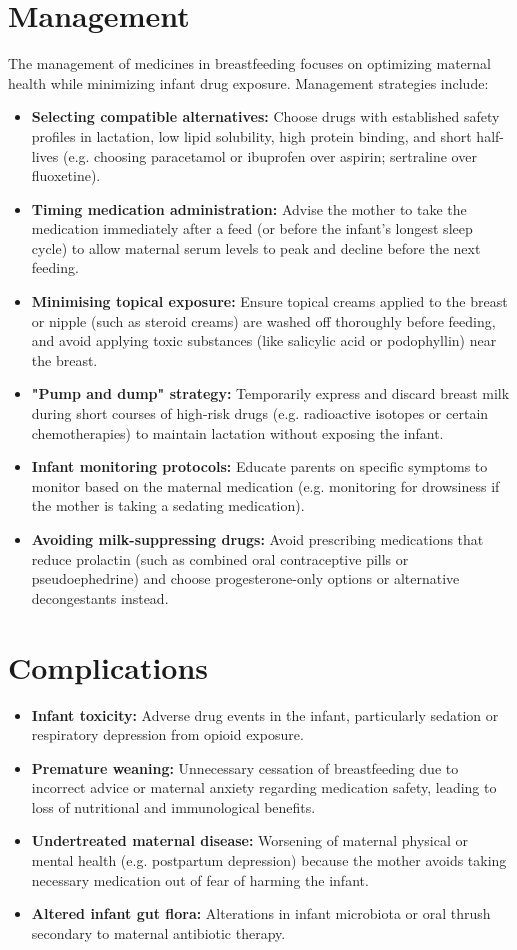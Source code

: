 \section*{Management}
The management of medicines in breastfeeding focuses on optimizing maternal health while minimizing infant drug exposure. Management strategies include:
\begin{itemize}
    \item \textbf{Selecting compatible alternatives:} Choose drugs with established safety profiles in lactation, low lipid solubility, high protein binding, and short half-lives (e.g. choosing paracetamol or ibuprofen over aspirin; sertraline over fluoxetine).
    \item \textbf{Timing medication administration:} Advise the mother to take the medication immediately after a feed (or before the infant's longest sleep cycle) to allow maternal serum levels to peak and decline before the next feeding.
    \item \textbf{Minimising topical exposure:} Ensure topical creams applied to the breast or nipple (such as steroid creams) are washed off thoroughly before feeding, and avoid applying toxic substances (like salicylic acid or podophyllin) near the breast.
    \item \textbf{"Pump and dump" strategy:} Temporarily express and discard breast milk during short courses of high-risk drugs (e.g. radioactive isotopes or certain chemotherapies) to maintain lactation without exposing the infant.
    \item \textbf{Infant monitoring protocols:} Educate parents on specific symptoms to monitor based on the maternal medication (e.g. monitoring for drowsiness if the mother is taking a sedating medication).
    \item \textbf{Avoiding milk-suppressing drugs:} Avoid prescribing medications that reduce prolactin (such as combined oral contraceptive pills or pseudoephedrine) and choose progesterone-only options or alternative decongestants instead.
\end{itemize}

\section*{Complications}
\begin{itemize}
    \item \textbf{Infant toxicity:} Adverse drug events in the infant, particularly sedation or respiratory depression from opioid exposure.
    \item \textbf{Premature weaning:} Unnecessary cessation of breastfeeding due to incorrect advice or maternal anxiety regarding medication safety, leading to loss of nutritional and immunological benefits.
    \item \textbf{Undertreated maternal disease:} Worsening of maternal physical or mental health (e.g. postpartum depression) because the mother avoids taking necessary medication out of fear of harming the infant.
    \item \textbf{Altered infant gut flora:} Alterations in infant microbiota or oral thrush secondary to maternal antibiotic therapy.
\end{itemize}

